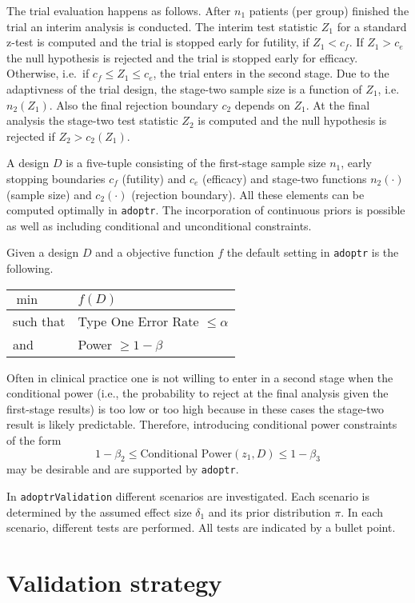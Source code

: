 \documentclass[]{book}
\begin{document}
The trial evaluation happens as follows.
After \(n_1\) patients (per group) finished the trial an interim analysis
is conducted. The interim test statistic \(Z_1\) for a standard z-test is computed
and the trial is stopped early for futility, if \(Z_1 < c_f\).
If \(Z_1 > c_e\) the null hypothesis is rejected and the trial is stopped early
for efficacy. Otherwise, i.e.~if \(c_f \leq Z_1 \leq c_e\), the trial enters
in the second stage. Due to the adaptivness of the trial design, the
stage-two sample size is a function of \(Z_1\), i.e. \(n_2(Z_1)\).
Also the final rejection boundary \(c_2\) depends on \(Z_1\).
At the final analysis the stage-two test statistic \(Z_2\) is computed and
the null hypothesis is rejected if \(Z_2 > c_2(Z_1)\).

A design \(D\) is a five-tuple consisting of the first-stage sample size
\(n_1\), early stopping boundaries \(c_f\) (futility) and \(c_e\) (efficacy)
and stage-two functions \(n_2(\cdot)\) (sample size) and \(c_2(\cdot)\)
(rejection boundary).
All these elements can be computed optimally in \texttt{adoptr}.
The incorporation of continuous priors is possible as well as including
conditional and unconditional constraints.

Given a design \(D\) and a objective function \(f\)
the default setting in \texttt{adoptr} is the following.

\begin{longtable}[]{@{}ll@{}}
\toprule
\(\min\) & \(f(D)\)\tabularnewline
\midrule
\endhead
such that & Type One Error Rate \(\leq \alpha\)\tabularnewline
and & Power \(\geq 1 - \beta\)\tabularnewline
\bottomrule
\end{longtable}

Often in clinical practice one is not willing to enter in a second
stage when the conditional power (i.e., the probability to reject at
the final analysis given the first-stage results) is too low or too high
because in these cases the stage-two result is likely predictable.
Therefore, introducing conditional power constraints of the form
\[
1 - \beta_2 \leq \text{Conditional Power}(z_1, D) \leq 1 - \beta_3
\]
may be desirable and are supported by \texttt{adoptr}.

In \texttt{adoptrValidation} different scenarios are investigated.
Each scenario is determined by the assumed effect size \(\delta_1\) and its
prior distribution \(\pi\).
In each scenario, different tests are performed.
All tests are indicated by a bullet point.

\hypertarget{validation-strategy}{%
\section{Validation strategy}\label{validation-strategy}}
\end{document}
